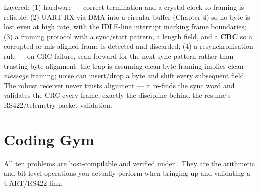 Layered: (1) hardware --- correct termination and a crystal clock so framing is
reliable; (2) UART RX via DMA into a circular buffer (Chapter 4) so no byte is
lost even at high rate, with the IDLE-line interrupt marking frame boundaries;
(3) a framing protocol with a sync/start pattern, a length field, and a
\textbf{CRC} so a corrupted or mis-aligned frame is detected and discarded;
(4) a resynchronisation rule --- on CRC failure, scan forward for the next sync
pattern rather than trusting byte alignment. \trap the trap is assuming clean
byte framing implies clean \emph{message} framing; noise can insert/drop a byte
and shift every subsequent field. The robust receiver never trusts alignment ---
it re-finds the sync word and validates the CRC every frame, exactly the
discipline behind the resume's RS422/telemetry packet validation.

\section{Coding Gym}

\begin{partnote}
All ten problems are host-compilable and verified under
. They are the arithmetic and bit-level
operations you actually perform when bringing up and validating a UART/RS422
link.
\end{partnote}

